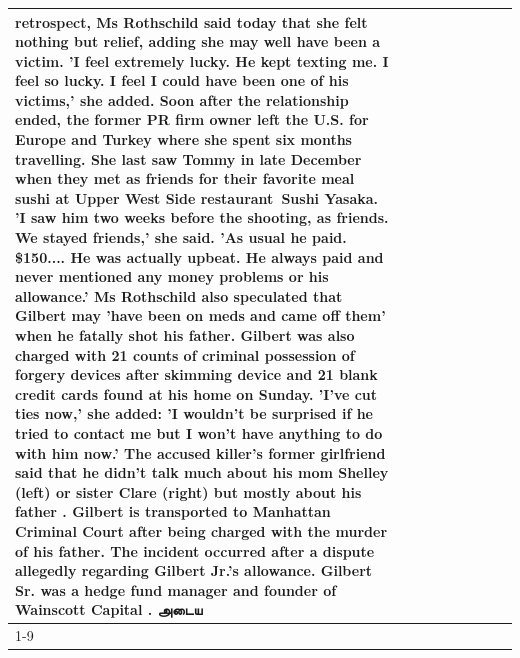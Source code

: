 \begin{table}[H]
\begin{tabular}{lllrlllll}
retrospect, Ms Rothschild said today that she felt nothing but relief, adding she may well have been a victim. 'I feel extremely lucky. He kept texting me. I feel so lucky. I feel I could have been one of his victims,' she added. Soon after the relationship ended, the former PR firm owner left the U.S. for Europe and Turkey where she spent six months  travelling. She last saw Tommy in late December when they met as friends for their favorite meal sushi at Upper West Side restaurant Sushi Yasaka. 'I saw him two weeks before the shooting, as friends. We stayed friends,' she said. 'As usual he paid. \$150.... He was actually upbeat. He always paid and never mentioned any money problems or his allowance.' Ms Rothschild also speculated that Gilbert may 'have been on meds and came off them' when he fatally shot his father. Gilbert was also charged with 21 counts of criminal possession of forgery devices after skimming device and 21 blank credit cards found at his home on Sunday. 'I've cut ties now,' she added: 'I wouldn’t be surprised if he tried to contact me but I won’t have anything to do with him now.' The accused killer's former girlfriend said that he didn't talk much about his mom Shelley (left) or sister Clare (right) but mostly about his father . Gilbert is transported to Manhattan Criminal Court  after being charged with the murder of his father. The incident occurred after a dispute allegedly regarding Gilbert Jr.'s allowance. Gilbert Sr. was a hedge fund manager and founder of Wainscott Capital . அடைய \\
\cline{1-9} \cline{2-9}

\end{tabular}
\end{table}
